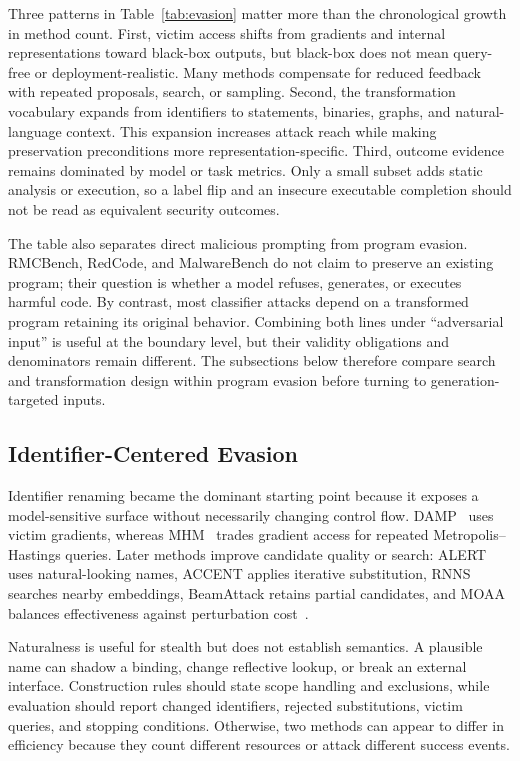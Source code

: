 \documentclass[acmsmall,screen,review]{acmart}
\begin{document}
Three patterns in Table~\ref{tab:evasion} matter more than the chronological growth in method count. First, victim access shifts from gradients and internal representations toward black-box outputs, but black-box does not mean query-free or deployment-realistic. Many methods compensate for reduced feedback with repeated proposals, search, or sampling. Second, the transformation vocabulary expands from identifiers to statements, binaries, graphs, and natural-language context. This expansion increases attack reach while making preservation preconditions more representation-specific. Third, outcome evidence remains dominated by model or task metrics. Only a small subset adds static analysis or execution, so a label flip and an insecure executable completion should not be read as equivalent security outcomes.

The table also separates direct malicious prompting from program evasion. RMCBench, RedCode, and MalwareBench do not claim to preserve an existing program; their question is whether a model refuses, generates, or executes harmful code. By contrast, most classifier attacks depend on a transformed program retaining its original behavior. Combining both lines under ``adversarial input'' is useful at the boundary level, but their validity obligations and denominators remain different. The subsections below therefore compare search and transformation design within program evasion before turning to generation-targeted inputs.

\subsection{Identifier-Centered Evasion}
Identifier renaming became the dominant starting point because it exposes a model-sensitive surface without necessarily changing control flow. DAMP~\cite{yefet2020adversarial} uses victim gradients, whereas MHM~\cite{zhang2020generating} trades gradient access for repeated Metropolis--Hastings queries. Later methods improve candidate quality or search: ALERT uses natural-looking names, ACCENT applies iterative substitution, RNNS searches nearby embeddings, BeamAttack retains partial candidates, and MOAA balances effectiveness against perturbation cost~\cite{yang2022natural,zhou2022accent,zhang2023rnns,gu2023beamattack,moaa2024}.

Naturalness is useful for stealth but does not establish semantics. A plausible name can shadow a binding, change reflective lookup, or break an external interface. Construction rules should state scope handling and exclusions, while evaluation should report changed identifiers, rejected substitutions, victim queries, and stopping conditions. Otherwise, two methods can appear to differ in efficiency because they count different resources or attack different success events.
\end{document}
